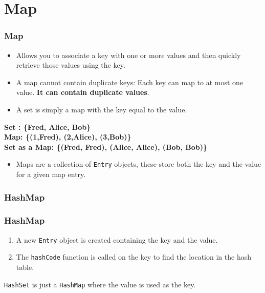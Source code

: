 \documentclass{beamer}
\begin{document}
\section{Map}
\begin{frame}
\frametitle{Map}
\begin{itemize}
\item Allows you to associate a key with one or more values and then quickly retrieve those values using the key.
\item A map cannot contain duplicate keys: Each key can map to at most one value. \textbf{It can contain duplicate values}.
\item A set is simply a map with the key equal to the value.
\end{itemize}
\textbf{
Set : \{Fred, Alice, Bob\}\\
Map:  \{(1,Fred), (2,Alice), (3,Bob)\}\\
Set as a Map: \{(Fred, Fred), (Alice, Alice), (Bob, Bob)\}\\}
\begin{itemize}
\item Maps are a collection of \texttt{Entry} objects, these store both the key and the value for a given map entry.
\end{itemize}
\end{frame}
\subsubsection{HashMap}
\begin{frame}
\frametitle{HashMap}
\hash
\begin{enumerate}
\item A new \texttt{Entry} object is created containing the key and the value.
\item The \texttt{hashCode} function is called on the key to find the location in the hash table.
\end{enumerate}
\texttt{HashSet} is just a \texttt{HashMap} where the value is used as the key.
\end{frame}
\end{document}
